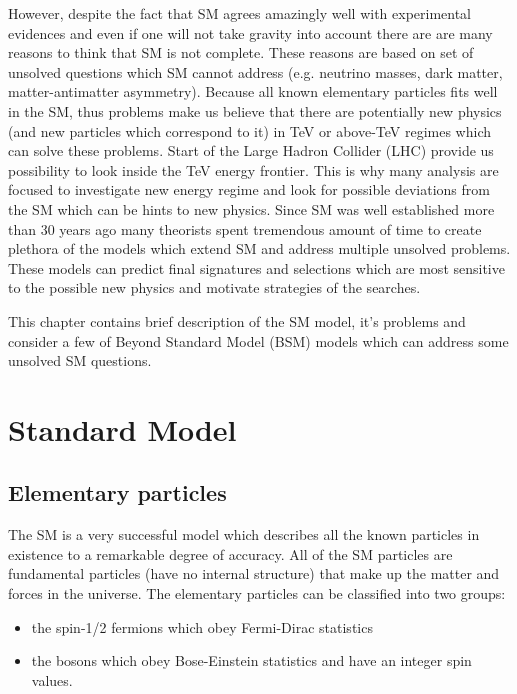 However, despite the fact that SM agrees amazingly well with experimental evidences and even if one will not take gravity into account 
there are are many reasons to think that SM is not complete.
These reasons are based on set of unsolved questions which SM cannot address (e.g. neutrino masses, dark matter, matter-antimatter asymmetry).
Because all known elementary particles fits well in the SM, thus problems make us believe that there are
potentially new physics (and new particles which correspond to it) in TeV or above-TeV regimes which can solve these problems.
Start of the Large Hadron Collider (LHC) provide us possibility to look inside the TeV energy frontier.
This is why many analysis are focused to investigate new energy regime and look for possible deviations from the SM which can be hints to new physics.
Since SM was well established more than 30 years ago many theorists spent tremendous amount of time to create
plethora of the models which extend SM and address multiple unsolved problems. These models can predict final signatures and selections which are most sensitive to 
the possible new physics and motivate strategies of the searches.

This chapter contains brief description of the SM model, it's problems and consider a few of Beyond Standard Model (BSM) models which can address some unsolved SM questions.

\section{Standard Model}

\subsection{Elementary particles}


The SM is a very successful model which describes all the known particles in existence to a remarkable degree of accuracy.
All of the SM particles are fundamental particles (have no internal structure) that make up the matter and forces in the universe.
The elementary particles can be classified into two groups: 
\begin{itemize}
 \item the spin-1/2 fermions which obey Fermi-Dirac statistics
 \item the bosons which obey Bose-Einstein statistics and have an integer spin values.
\end{itemize}

